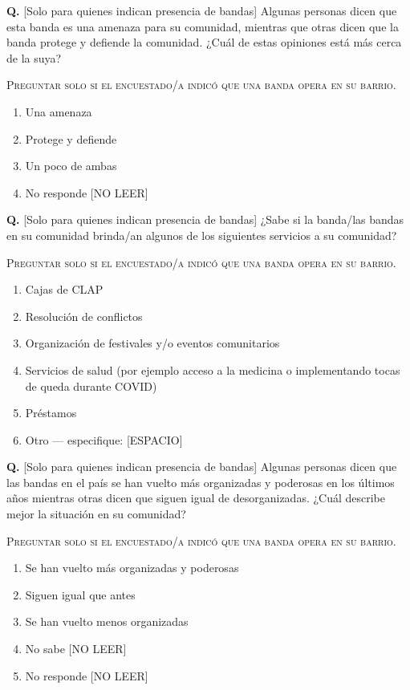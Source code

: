\documentclass[11pt,letterpaper]{article}
\newcounter{question}
\newcommand{\question}[1]{%
  \stepcounter{question}%
  \vspace{0.3em}%
  \noindent\textbf{Q\thequestion.} #1%
}
\newcommand{\instruction}[1]{%
  \vspace{0.1em}%
  \noindent\textsc{\small #1}%
  \vspace{0.1em}%
}
\newenvironment{responses}
{\begin{enumerate}[label=(\arabic*), leftmargin=2em, itemsep=0em, parsep=0em, topsep=0em]}
{\end{enumerate}\vspace{0.3em}}
\begin{document}
\question{[Solo para quienes indican presencia de bandas] Algunas personas dicen que esta banda es una amenaza para su comunidad, mientras que otras dicen que la banda protege y defiende la comunidad. ¿Cuál de estas opiniones está más cerca de la suya?}

\instruction{Preguntar solo si el encuestado/a indicó que una banda opera en su barrio.}
\begin{responses}
\item Una amenaza
\item Protege y defiende
\item Un poco de ambas
\item[(99)] No responde [NO LEER]
\end{responses}

\question{[Solo para quienes indican presencia de bandas] ¿Sabe si la banda/las bandas en su comunidad brinda/an algunos de los siguientes servicios a su comunidad?}

\instruction{Preguntar solo si el encuestado/a indicó que una banda opera en su barrio.}
\begin{responses}
\item Cajas de CLAP 
\item Resolución de conflictos
\item Organización de festivales y/o eventos comunitarios
\item Servicios de salud (por ejemplo acceso a la medicina o implementando tocas de queda durante COVID) 
\item Préstamos
\item Otro — especifique: [ESPACIO]
\end{responses}

\question{[Solo para quienes indican presencia de bandas] Algunas personas dicen que las bandas en el país se han vuelto más organizadas y poderosas en los últimos años mientras otras dicen que siguen igual de desorganizadas. ¿Cuál describe mejor la situación en su comunidad?}

\instruction{Preguntar solo si el encuestado/a indicó que una banda opera en su barrio.}
\begin{responses}
\item Se han vuelto más organizadas y poderosas
\item Siguen igual que antes
\item Se han vuelto menos organizadas
\item[(98)] No sabe [NO LEER]
\item[(99)] No responde [NO LEER]
\end{responses}
\end{document}
